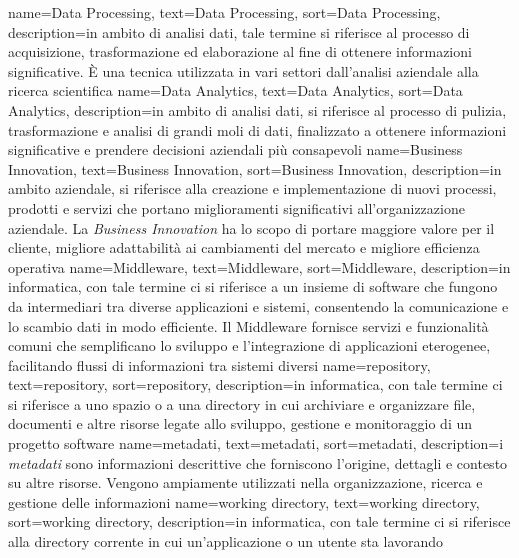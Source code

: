 {
    name={Data Processing},
    text=Data Processing,
    sort=Data Processing,
    description={in ambito di analisi dati, tale termine si riferisce al processo di acquisizione, trasformazione ed elaborazione al fine di 
    ottenere informazioni significative. È una tecnica utilizzata in vari settori dall'analisi aziendale alla ricerca scientifica}
}
{
    name={Data Analytics},
    text=Data Analytics,
    sort=Data Analytics,
    description={in ambito di analisi dati, si riferisce al processo di pulizia, trasformazione e analisi di grandi moli di dati, finalizzato
    a ottenere informazioni significative e prendere decisioni aziendali più consapevoli}
}
{
    name={Business Innovation},
    text=Business Innovation,
    sort=Business Innovation,
    description={in ambito aziendale, si riferisce alla creazione e implementazione di nuovi processi, prodotti e servizi
    che portano miglioramenti significativi all'organizzazione aziendale. La \textit{Business Innovation} ha lo scopo di portare 
    maggiore valore per il cliente, migliore adattabilità ai cambiamenti del mercato e migliore efficienza operativa}
}
{
    name={Middleware},
    text=Middleware,
    sort=Middleware,
    description={in informatica, con tale termine ci si riferisce a un insieme di software che fungono da intermediari tra diverse applicazioni 
    e sistemi, consentendo la comunicazione e lo scambio dati in modo efficiente. Il Middleware fornisce servizi e funzionalità comuni che 
    semplificano lo sviluppo e l'integrazione di applicazioni eterogenee, facilitando flussi di informazioni tra sistemi diversi}
}
{
    name={repository},
    text=repository,
    sort=repository,
    description={in informatica, con tale termine ci si riferisce a uno spazio o a una directory in cui archiviare e organizzare
    file, documenti e altre risorse legate allo sviluppo, gestione e monitoraggio di un progetto software}
}
{
    name={metadati},
    text=metadati,
    sort=metadati,
    description={i \textit{metadati} sono informazioni descrittive che forniscono l'origine, dettagli e contesto su altre risorse. Vengono ampiamente utilizzati 
    nella organizzazione, ricerca e gestione delle informazioni} 
}
{
    name={working directory},
    text=working directory,
    sort=working directory,
    description={in informatica, con tale termine ci si riferisce alla directory corrente in cui un'applicazione o un utente sta lavorando}
}
